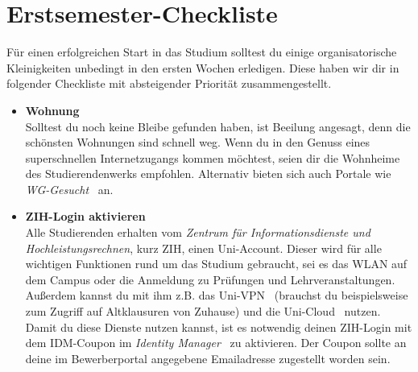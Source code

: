 \newcommand{\checkbox}[1]{\item[$\square$]\textbf{#1}\\}

\chapter*{Erstsemester-Checkliste}

Für einen erfolgreichen Start in das Studium solltest du einige organisatorische
Kleinigkeiten unbedingt in den ersten Wochen erledigen. Diese haben wir dir in
folgender Checkliste mit absteigender Priorität zusammengestellt.

\begin{itemize}[leftmargin=*]

\checkbox{Wohnung}
Solltest du noch keine Bleibe gefunden haben, ist Beeilung angesagt, denn die
schönsten Wohnungen sind schnell weg. Wenn du in den Genuss eines
superschnellen Internetzugangs kommen möchtest, seien dir die Wohnheime~ des
Studierendenwerks empfohlen. Alternativ bieten sich auch Portale wie
\textit{\mbox{WG-Gesucht}}~ an.

\checkbox{ZIH-Login aktivieren}
Alle Studierenden erhalten vom \textit{Zentrum für Informationsdienste und
Hochleistungsrechnen}, kurz ZIH, einen Uni-Account. Dieser wird für alle
wichtigen Funktionen rund um das Studium gebraucht, sei es das WLAN auf dem
Campus oder die Anmeldung zu Prüfungen und Lehrveranstaltungen.
Außerdem kannst du mit ihm z.B. das Uni-VPN~
(brauchst du beispielsweise zum Zugriff auf Altklausuren von Zuhause) und die
Uni-Cloud~
nutzen.\\
Damit du diese Dienste nutzen kannst, ist es notwendig deinen ZIH-Login mit dem
IDM-Coupon im \textit{Identity Manager}~
zu aktivieren. Der Coupon sollte an deine im Bewerberportal angegebene
Emailadresse zugestellt worden sein.


\end{itemize}
